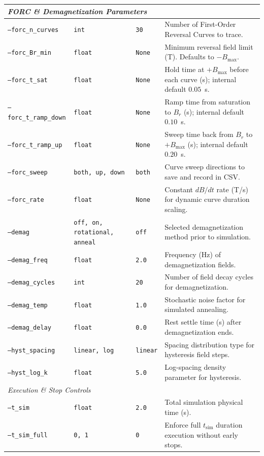 \documentclass[11pt,a4paper]{article}
\newcommand{\code}[1]{\texttt{#1}}
\begin{document}
\begin{longtable}{lp{3.5cm}lp{6.0cm}}
\multicolumn{4}{l}{\textit{FORC \& Demagnetization Parameters}} \\
\midrule
\code{--forc\_n\_curves} & \code{int} & \code{30} & Number of First-Order Reversal Curves to trace. \\
\code{--forc\_Br\_min} & \code{float} & \code{None} & Minimum reversal field limit (\si{T}). Defaults to $-B_{\max}$. \\
\code{--forc\_t\_sat} & \code{float} & \code{None} & Hold time at $+B_{\max}$ before each curve (\si{s}); internal default $0.05$~s. \\
\code{--forc\_t\_ramp\_down} & \code{float} & \code{None} & Ramp time from saturation to $B_r$ (\si{s}); internal default $0.10$~s. \\
\code{--forc\_t\_ramp\_up} & \code{float} & \code{None} & Sweep time back from $B_r$ to $+B_{\max}$ (\si{s}); internal default $0.20$~s. \\
\code{--forc\_sweep} & \code{both, up, down} & \code{both} & Curve sweep directions to save and record in CSV. \\
\code{--forc\_rate} & \code{float} & \code{None} & Constant $dB/dt$ rate (\si{T/s}) for dynamic curve duration scaling. \\
\code{--demag} & \code{off, on, rotational, anneal} & \code{off} & Selected demagnetization method prior to simulation. \\
\code{--demag\_freq} & \code{float} & \code{2.0} & Frequency (\si{Hz}) of demagnetization fields. \\
\code{--demag\_cycles} & \code{int} & \code{20} & Number of field decay cycles for demagnetization. \\
\code{--demag\_temp} & \code{float} & \code{1.0} & Stochastic noise factor for simulated annealing. \\
\code{--demag\_delay} & \code{float} & \code{0.0} & Rest settle time (\si{s}) after demagnetization ends. \\
\code{--hyst\_spacing} & \code{linear, log} & \code{linear} & Spacing distribution type for hysteresis field steps. \\
\code{--hyst\_log\_k} & \code{float} & \code{5.0} & Log-spacing density parameter for hysteresis. \\
\midrule

\multicolumn{4}{l}{\textit{Execution \& Stop Controls}} \\
\midrule
\code{--t\_sim} & \code{float} & \code{2.0} & Total simulation physical time (\si{s}). \\
\code{--t\_sim\_full} & \code{0, 1} & \code{0} & Enforce full $t_{\text{sim}}$ duration execution without early stops. \\
\midrule


\end{longtable}
\end{document}
